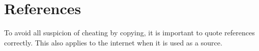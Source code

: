\documentclass{article}
\begin{document}
	\section{References}
	To avoid all suspicion of cheating by copying, it is important to quote references
	correctly. This also applies to the internet when it is used as a source. 
	
\end{document}
